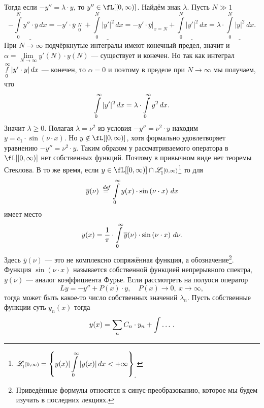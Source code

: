 Тогда если $-y''=\lambda\cdot y$, то $y''\in\fL[{[0,\infty)}]$. Найдём знак $\lambda$. Пусть $N\gg1$
\begin{equation*}
	-\underline{\int\limits_0^N y''\cdot\overline{y}\,dx}=-y'\cdot\overline{y}\mathop{\Big|}\limits_{0}^{N}+\underline{\int\limits_0^N|y'|^2\,dx}=-y'\cdot\overline{y}\Big|_{x=N}+\underline{\int\limits_0^N|y'|^2\,dx}=\lambda\cdot\underline{\int\limits_0^N|y|^2\,dx}.
\end{equation*}    
При $N\to\infty$ подчёркнутые интегралы имеют конечный предел, значит и $\alpha=\lim\limits_{N\to\infty}y'(N)\cdot y(N)$ --- существует и конечен. Но так как интеграл  $\smallint\limits_0^{\infty}|y'\cdot y|\,dx$ --- конечен, то $\alpha=0$ и поэтому в пределе при $N\to\infty$ мы получаем, что
\begin{equation*}
	\hfill\int\limits_0^{\infty}|y'|^2\,dx=\lambda\cdot\int\limits_0^{\infty}y^2\,dx.\hfill
\end{equation*}
Значит $\lambda\geqslant0$. Полагая $\lambda=\nu^2$ из условия $-y''=\nu^2\cdot y$ находим $y=c_1\cdot\sin\left(\nu\cdot x\right)$. Но $y\notin\fL[{[0,\infty)}]$, хотя формально удовлетворяет уравнению $-y''=\nu^2\cdot y$. Таким образом у рассматриваемого оператора в $\fL[{[0,\infty)}]$ нет собственных функций. Поэтому в привычном виде нет теоремы Стеклова. В то же время, если $y\in\fL[{[0,\infty)}]\cap\fLone[{[0,\infty)}]$\footnote{$\displaystyle\fLone[{[0,\infty)}]=\left\{y(x)|\int\limits_{0}^{\infty}|y(x)|\,dx<+\infty\right\}_{\displaystyle.}$} то для 
\begin{equation*}
	\hfill \overline{y}(\nu)\eqdef\int\limits_0^{\infty}y(x)\cdot\sin\left(\nu\cdot x\right)\,dx\hfill
\end{equation*}
имеет место 
\begin{equation*}
	\hfill y(x)=\frac{1}{\pi}\cdot\int\limits_0^{\infty}\overline{y}(\nu)\cdot\sin\left(\nu\cdot x\right)\,d\nu.\hfill
\end{equation*}
Здесь $\overline{y}(\nu)$ --- это не комплексно сопряжённая функция, а обозначение\footnote{Приведённые формулы относятся к синус-преобразованию, которое мы будем изучать в последних лекциях.}.
Функция $\sin\left(\nu\cdot x\right)$ называется собственной функцией непрерывного спектра, $\overline{y}(\nu)$ --- аналог коэффициента Фурье. Если рассмотреть на полуоси оператор 
\begin{equation*}
	Ly=-y''+P(x)\cdot y,\quad P(x)\to0,\ x\to\infty,
\end{equation*}
тогда может быть какое-то число собственных значений $\lambda_n$. Пусть собственные функции суть $y_n(x)$ тогда
\begin{equation*}
	\hfill y(x)=\sum\limits_{n}C_n\cdot y_n+\int\dots\,.\hfill
\end{equation*}
